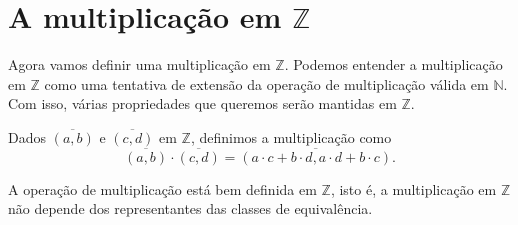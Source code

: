 \documentclass[../main.tex]{subfiles}
\begin{document}
\section{A multiplicação em $\mathbb{Z}$}
Agora vamos definir uma multiplicação em $\mathbb{Z}$. Podemos entender a multiplicação em $\mathbb{Z}$ como uma tentativa de extensão da operação de multiplicação válida em $\mathbb{N}$. Com isso, várias propriedades que queremos serão mantidas em $\mathbb{Z}$.
\begin{defi}\label{int-def-produto}
    Dados $\overline{(a,b)}$ e $\overline{(c,d)}$ em $\mathbb{Z}$, definimos a multiplicação como 
    \[ \overline{(a,b)} \cdot \overline{(c,d)} = \overline{(a \cdot c + b \cdot d, a \cdot d + b \cdot c)}. \]
\end{defi}
\begin{teo}\label{int-teo-produtoBemDefinido}
    A operação de multiplicação está bem definida em $\mathbb{Z}$, isto é, a multiplicação em $\mathbb{Z}$ não depende dos representantes das classes de equivalência. 
\end{teo}
\end{document}
